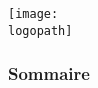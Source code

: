 \documentclass{beamer}
\title[\meetingname]{{\bf \subtitle}}
\author{\authorname}
\institute[\institutionshort]{\institutionname}
\date[\mydate]{\meetingname\\\today}
\def\logopath{path/to/logo}
\def\companylogo{\texttt{[image: \\logopath]}}
\begin{document}
\begin{frame}[plain,t]
\titlepage
	\begin{center}
	
	\companylogo
	\end{center}
\end{frame}


\begin{frame}
	\frametitle{Sommaire}
	\tableofcontents
\end{frame}
\end{document}

